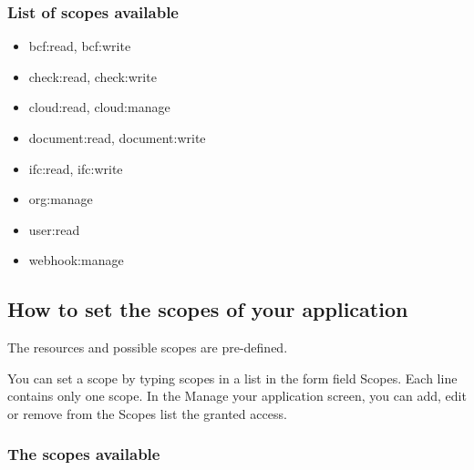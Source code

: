 \documentclass[a4paper,12pt,english]{sphinxmanual}
\begin{document}
\subsubsection{List of scopes available}
\label{\detokenize{concepts/scopes:list-of-scopes-available}}\begin{itemize}
\item {} 
bcf:read, bcf:write

\item {} 
check:read, check:write

\item {} 
cloud:read, cloud:manage

\item {} 
document:read, document:write

\item {} 
ifc:read, ifc:write

\item {} 
org:manage

\item {} 
user:read

\item {} 
webhook:manage

\end{itemize}


\subsection{How to set the scopes of your application}
\label{\detokenize{concepts/scopes:how-to-set-the-scopes-of-your-application}}
The resources and possible scopes are pre-defined.

You can set a scope by typing scopes in a list in the form field Scopes. Each line contains only one scope. In the Manage your application screen, you can add, edit or remove from the Scopes list the granted access.


\subsubsection{The scopes available}
\label{\detokenize{concepts/scopes:the-scopes-available}}
\end{document}
